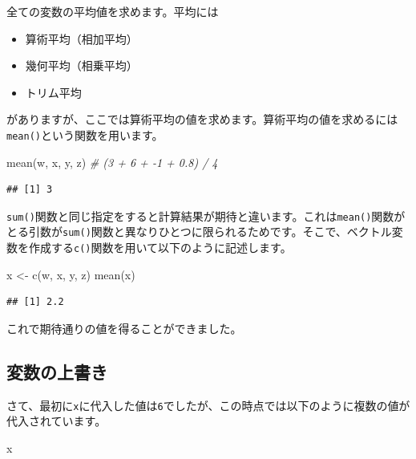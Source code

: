 \documentclass[
  12pt,
]{book}
\newenvironment{Shaded}{\begin{snugshade}}{\end{snugshade}}
\newcommand{\CommentTok}[1]{\textcolor[rgb]{0.56,0.35,0.01}{\textit{#1}}}
\newcommand{\FunctionTok}[1]{\textcolor[rgb]{0.00,0.00,0.00}{#1}}
\newcommand{\NormalTok}[1]{#1}
\newcommand{\OtherTok}[1]{\textcolor[rgb]{0.56,0.35,0.01}{#1}}
\providecommand{\tightlist}{%
  \setlength{\itemsep}{0pt}\setlength{\parskip}{0pt}}
\begin{document}
全ての変数の平均値を求めます。平均には

\begin{itemize}
\tightlist
\item
  算術平均（相加平均）
\item
  幾何平均（相乗平均）
\item
  トリム平均
\end{itemize}

がありますが、ここでは算術平均の値を求めます。算術平均の値を求めるには\texttt{mean()}という関数を用います。

\begin{Shaded}
\begin{Highlighting}[numbers=left,,]
\FunctionTok{mean}\NormalTok{(w, x, y, z)   }\CommentTok{\# (3 + 6 + {-}1 + 0.8) / 4}
\end{Highlighting}
\end{Shaded}

\begin{verbatim}
## [1] 3
\end{verbatim}

\texttt{sum()}関数と同じ指定をすると計算結果が期待と違います。これは\texttt{mean()}関数がとる引数が\texttt{sum()}関数と異なりひとつに限られるためです。そこで、ベクトル変数を作成する\texttt{c()}関数を用いて以下のように記述します。

\begin{Shaded}
\begin{Highlighting}[numbers=left,,]
\NormalTok{x }\OtherTok{\textless{}{-}} \FunctionTok{c}\NormalTok{(w, x, y, z)}
\FunctionTok{mean}\NormalTok{(x)}
\end{Highlighting}
\end{Shaded}

\begin{verbatim}
## [1] 2.2
\end{verbatim}

これで期待通りの値を得ることができました。

\hypertarget{ux5909ux6570ux306eux4e0aux66f8ux304d}{%
\subsection{変数の上書き}\label{ux5909ux6570ux306eux4e0aux66f8ux304d}}

さて、最初に\texttt{x}に代入した値は\texttt{6}でしたが、この時点では以下のように複数の値が代入されています。

\begin{Shaded}
\begin{Highlighting}[numbers=left,,]
\NormalTok{x}
\end{Highlighting}
\end{Shaded}
\end{document}
